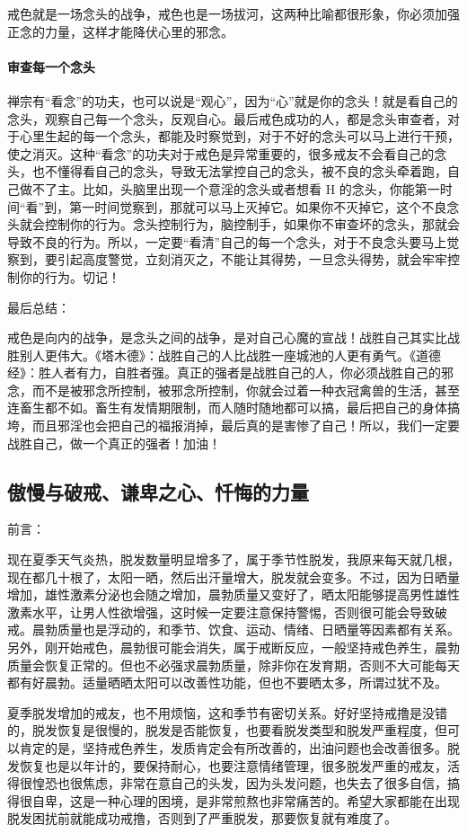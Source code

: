 \documentclass{ctexart}
\begin{document}
戒色就是一场念头的战争，戒色也是一场拔河，这两种比喻都很形象，你必须加强正念的力量，这样才能降伏心里的邪念。

\paragraph{审查每一个念头} 禅宗有“看念”的功夫，也可以说是“观心”，因为“心”就是你的念头！就是看自己的念头，观察自己每一个念头，反观自心。最后戒色成功的人，都是念头审查者，对于心里生起的每一个念头，都能及时察觉到，对于不好的念头可以马上进行干预，使之消灭。这种“看念”的功夫对于戒色是异常重要的，很多戒友不会看自己的念头，也不懂得看自己的念头，导致无法掌控自己的念头，被不良的念头牵着跑，自己做不了主。比如，头脑里出现一个意淫的念头或者想看 H 的念头，你能第一时间“看”到，第一时间觉察到，那就可以马上灭掉它。如果你不灭掉它，这个不良念头就会控制你的行为。念头控制行为，脑控制手，如果你不审查坏的念头，那就会导致不良的行为。所以，一定要“看清”自己的每一个念头，对于不良念头要马上觉察到，要引起高度警觉，立刻消灭之，不能让其得势，一旦念头得势，就会牢牢控制你的行为。切记！

最后总结：

戒色是向内的战争，是念头之间的战争，是对自己心魔的宣战！战胜自己其实比战胜别人更伟大。《塔木德》：战胜自己的人比战胜一座城池的人更有勇气。《道德经》：胜人者有力，自胜者强。真正的强者是战胜自己的人，你必须战胜自己的邪念，而不是被邪念所控制，被邪念所控制，你就会过着一种衣冠禽兽的生活，甚至连畜生都不如。畜生有发情期限制，而人随时随地都可以搞，最后把自己的身体搞垮，而且邪淫也会把自己的福报消掉，最后真的是害惨了自己！所以，我们一定要战胜自己，做一个真正的强者！加油！

\subsection{傲慢与破戒、谦卑之心、忏悔的力量}

前言：

现在夏季天气炎热，脱发数量明显增多了，属于季节性脱发，我原来每天就几根，现在都几十根了，太阳一晒，然后出汗量增大，脱发就会变多。不过，因为日晒量增加，雄性激素分泌也会随之增加，晨勃质量又变好了，晒太阳能够提高男性雄性激素水平，让男人性欲增强，这时候一定要注意保持警惕，否则很可能会导致破戒。晨勃质量也是浮动的，和季节、饮食、运动、情绪、日晒量等因素都有关系。另外，刚开始戒色，晨勃很可能会消失，属于戒断反应，一般坚持戒色养生，晨勃质量会恢复正常的。但也不必强求晨勃质量，除非你在发育期，否则不大可能每天都有好晨勃。适量晒晒太阳可以改善性功能，但也不要晒太多，所谓过犹不及。

夏季脱发增加的戒友，也不用烦恼，这和季节有密切关系。好好坚持戒撸是没错的，脱发恢复是很慢的，脱发是否能恢复，也要看脱发类型和脱发严重程度，但可以肯定的是，坚持戒色养生，发质肯定会有所改善的，出油问题也会改善很多。脱发恢复也是以年计的，要保持耐心，也要注意情绪管理，很多脱发严重的戒友，活得很惶恐也很焦虑，非常在意自己的头发，因为头发问题，也失去了很多自信，搞得很自卑，这是一种心理的困境，是非常煎熬也非常痛苦的。希望大家都能在出现脱发困扰前就能成功戒撸，否则到了严重脱发，那要恢复就有难度了。
\end{document}

